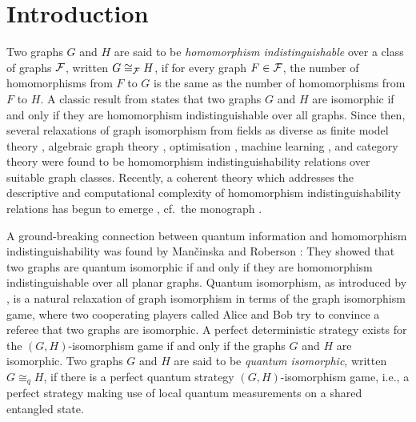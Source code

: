\documentclass[a4paper,onecolumn,11pt,accepted=2026-01-06]{quantumarticle}
\theoremstyle{plain}
\theoremstyle{remark}
\theoremstyle{definition}
\begin{document}
\newpage
\setcounter{tocdepth}{2}
\tableofcontents

\section{Introduction}

Two graphs $G$ and $H$ are said to be \emph{homomorphism indistinguishable} over a class of graphs ${\mathcal F}$, written $G \cong_{{\mathcal F}} H$, if for every graph $F \in {\mathcal F}$, the number of homomorphisms from $F$ to $G$ is the same as the number of homomorphisms from $F$ to $H$. A classic result from \cite{lovasz_operations_1967} states that two graphs $G$ and $H$ are isomorphic if and only if they are homomorphism indistinguishable over all graphs. 
Since then, several relaxations of graph isomorphism from fields as diverse as finite model theory \cite{sherali-adams-3,grohe_counting_2020,fluck_going_2024}, algebraic graph theory \cite{dell_lovasz_2018}, optimisation \cite{grohe_homomorphism_2022,roberson-seppelt-arxiv}, machine learning \cite{xu_how_2019,morris_weisfeiler_2019,zhang_beyond_2024}, and category theory \cite{dawar_lovasz-type_2021,abramsky_discrete_2022,montacute_pebble-relation_2022} were found to be homomorphism indistinguishability relations over suitable graph classes. 
Recently, a coherent theory which addresses the descriptive and computational complexity of homomorphism indistinguishability relations has begun to emerge \cite{roberson_oddomorphisms_2022,seppelt_logical_2023,neuen_homomorphism-distinguishing_2023,seppelt_algorithmic_2024}, cf.\ the monograph \cite{seppelt_homomorphism_2024}.

A ground-breaking connection between quantum information and homomorphism indistinguishability was found by Man\v{c}inska and Roberson \cite{david-laura}: 
They showed that two graphs are quantum isomorphic if and only if they are homomorphism indistinguishable over all planar graphs.
Quantum isomorphism, as introduced by \cite{ATSERIAS2019289}, is a natural relaxation of graph isomorphism in terms of the graph isomorphism game, where two cooperating players called Alice and Bob try to convince a referee that two graphs are isomorphic. A perfect deterministic strategy exists for the $(G, H)$-isomorphism game if and only if the graphs $G$ and $H$ are isomorphic. 
Two graphs $G$ and $H$ are said to be \emph{quantum isomorphic}, written $G \cong_q H$, if there is a perfect quantum strategy $(G, H)$-isomorphism game, i.e., a perfect strategy making use of local quantum measurements on a shared entangled state. 
\end{document}
